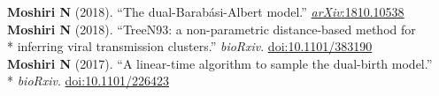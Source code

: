 \documentclass[margin,line]{res}
\begin{document}
\begin{resume}
\hspace*{4mm} \vspace{2mm}\textbf{Moshiri N} (2018). ``The dual-Barab\'asi-Albert model.'' \href{https://arxiv.org/abs/1810.10538}{\textit{arXiv}:1810.10538}\\
\hspace*{4mm} \textbf{Moshiri N} (2018). ``TreeN93: a non-parametric distance-based method for\\*\vspace{2mm}
\hspace*{8mm} inferring viral transmission clusters.'' \textit{bioRxiv}. \href{https://doi.org/10.1101/383190}{doi:10.1101/383190}\\
\hspace*{4mm} \textbf{Moshiri N} (2017). ``A linear-time algorithm to sample the dual-birth model.''\\*\vspace{2mm}
\hspace*{8mm} \textit{bioRxiv}. \href{https://doi.org/10.1101/226423}{doi:10.1101/226423}\\


\end{resume}
\end{document}
